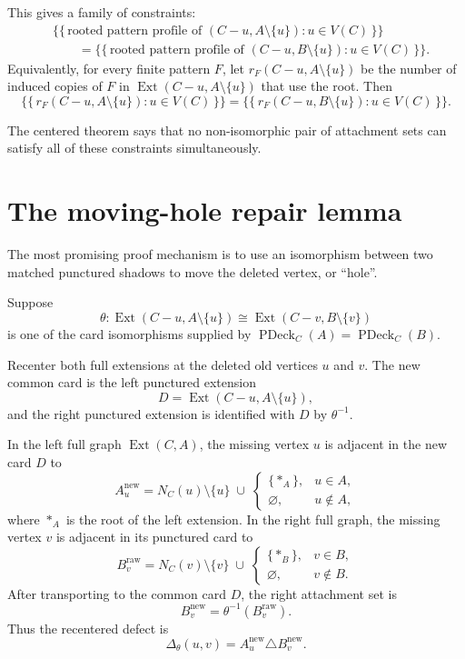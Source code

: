 \documentclass[11pt]{article}
\newcommand{\PDeck}{\operatorname{PDeck}}
\newcommand{\Ext}{\operatorname{Ext}}
\begin{document}
This gives a family of constraints:
\[
  \begin{aligned}
  &\{\!\{\,
      \text{rooted pattern profile of }(C-u,A\setminus\{u\})
      : u \in V(C)
    \,\}\!\}
  \\
  &\qquad =
    \{\!\{\,
      \text{rooted pattern profile of }(C-u,B\setminus\{u\})
      : u \in V(C)
    \,\}\!\}.
  \end{aligned}
\]
Equivalently, for every finite pattern \(F\), let
\(r_F(C-u,A\setminus\{u\})\) be the number of induced copies of \(F\) in
\(\Ext(C-u,A\setminus\{u\})\) that use the root.  Then
\[
  \{\!\{\, r_F(C-u,A\setminus\{u\}) : u \in V(C) \,\}\!\}
  =
  \{\!\{\, r_F(C-u,B\setminus\{u\}) : u \in V(C) \,\}\!\}.
\]

The centered theorem says that no non-isomorphic pair of attachment sets can
satisfy all of these constraints simultaneously.

\section{The moving-hole repair lemma}

The most promising proof mechanism is to use an isomorphism between two
matched punctured shadows to move the deleted vertex, or ``hole''.

Suppose
\[
  \theta :
  \Ext(C-u,A\setminus\{u\})
  \cong
  \Ext(C-v,B\setminus\{v\})
\]
is one of the card isomorphisms supplied by
\(\PDeck_C(A)=\PDeck_C(B)\).

Recenter both full extensions at the deleted old vertices \(u\) and \(v\).
The new common card is the left punctured extension
\[
  D = \Ext(C-u,A\setminus\{u\}),
\]
and the right punctured extension is identified with \(D\) by
\(\theta^{-1}\).

In the left full graph \(\Ext(C,A)\), the missing vertex \(u\) is adjacent in
the new card \(D\) to
\[
  A_u^{\mathrm{new}}
  =
  N_C(u)\setminus\{u\}
  \;\cup\;
  \begin{cases}
    \{\ast_A\}, & u \in A,\\
    \varnothing, & u \notin A,
  \end{cases}
\]
where \(\ast_A\) is the root of the left extension.  In the right full graph,
the missing vertex \(v\) is adjacent in its punctured card to
\[
  B_v^{\mathrm{raw}}
  =
  N_C(v)\setminus\{v\}
  \;\cup\;
  \begin{cases}
    \{\ast_B\}, & v \in B,\\
    \varnothing, & v \notin B.
  \end{cases}
\]
After transporting to the common card \(D\), the right attachment set is
\[
  B_v^{\mathrm{new}} = \theta^{-1}(B_v^{\mathrm{raw}}).
\]
Thus the recentered defect is
\[
  \Delta_{\theta}(u,v)
  =
  A_u^{\mathrm{new}} \triangle B_v^{\mathrm{new}}.
\]
\end{document}
